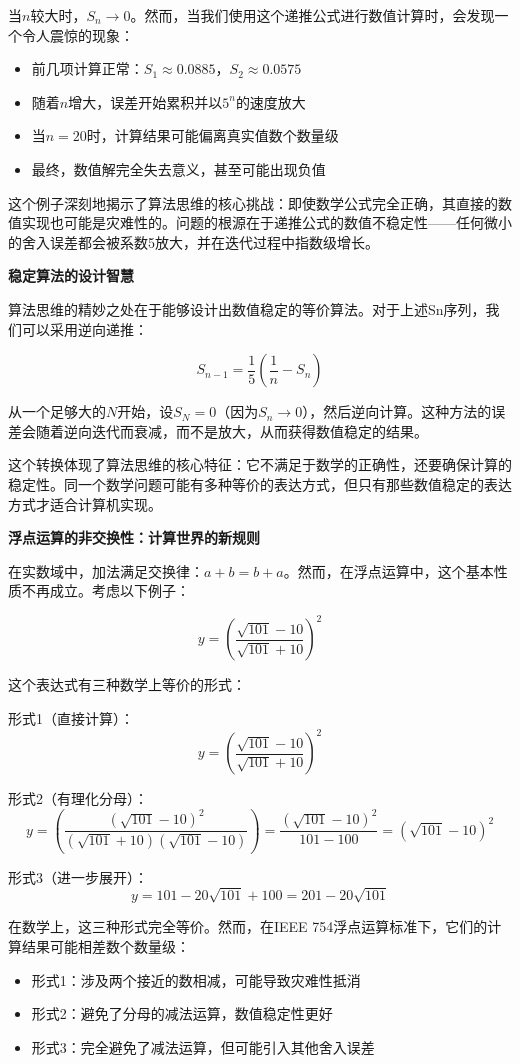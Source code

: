 当$n$较大时，$S_n \to 0$。然而，当我们使用这个递推公式进行数值计算时，会发现一个令人震惊的现象：

\begin{itemize}
\item 前几项计算正常：$S_1 \approx 0.0885$，$S_2 \approx 0.0575$
\item 随着$n$增大，误差开始累积并以$5^n$的速度放大
\item 当$n=20$时，计算结果可能偏离真实值数个数量级
\item 最终，数值解完全失去意义，甚至可能出现负值
\end{itemize}

这个例子深刻地揭示了算法思维的核心挑战：即使数学公式完全正确，其直接的数值实现也可能是灾难性的。问题的根源在于递推公式的数值不稳定性——任何微小的舍入误差都会被系数5放大，并在迭代过程中指数级增长。

\textbf{稳定算法的设计智慧}

算法思维的精妙之处在于能够设计出数值稳定的等价算法。对于上述Sn序列，我们可以采用逆向递推：

$$S_{n-1} = \frac{1}{5}\left(\frac{1}{n} - S_n\right)$$

从一个足够大的$N$开始，设$S_N = 0$（因为$S_n \to 0$），然后逆向计算。这种方法的误差会随着逆向迭代而衰减，而不是放大，从而获得数值稳定的结果。

这个转换体现了算法思维的核心特征：它不满足于数学的正确性，还要确保计算的稳定性。同一个数学问题可能有多种等价的表达方式，但只有那些数值稳定的表达方式才适合计算机实现。

\textbf{浮点运算的非交换性：计算世界的新规则}

在实数域中，加法满足交换律：$a + b = b + a$。然而，在浮点运算中，这个基本性质不再成立。考虑以下例子：

$$y = \left(\frac{\sqrt{101} - 10}{\sqrt{101} + 10}\right)^2$$

这个表达式有三种数学上等价的形式：

形式1（直接计算）：
$$y = \left(\frac{\sqrt{101} - 10}{\sqrt{101} + 10}\right)^2$$

形式2（有理化分母）：
$$y = \left(\frac{(\sqrt{101} - 10)^2}{(\sqrt{101} + 10)(\sqrt{101} - 10)}\right) = \frac{(\sqrt{101} - 10)^2}{101 - 100} = (\sqrt{101} - 10)^2$$

形式3（进一步展开）：
$$y = 101 - 20\sqrt{101} + 100 = 201 - 20\sqrt{101}$$

在数学上，这三种形式完全等价。然而，在IEEE 754浮点运算标准下，它们的计算结果可能相差数个数量级：

\begin{itemize}
\item 形式1：涉及两个接近的数相减，可能导致灾难性抵消
\item 形式2：避免了分母的减法运算，数值稳定性更好
\item 形式3：完全避免了减法运算，但可能引入其他舍入误差
\end{itemize}

